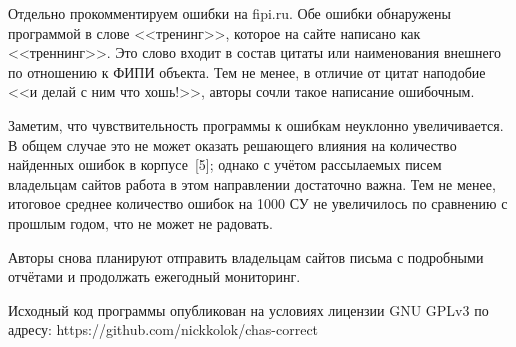 Отдельно прокомментируем ошибки на fipi.ru.
Обе ошибки обнаружены программой в слове <<тренинг>>,
которое на сайте написано как <<треннинг>>.
Это слово входит в состав цитаты или наименования внешнего по отношению к ФИПИ объекта.
Тем не менее, в отличие от цитат наподобие <<и делай с ним что хошь!>>,
авторы сочли такое написание ошибочным.

Заметим, что чувствительность программы к ошибкам неук\-лон\-но увеличивается.
В общем случае это не может оказать решающего влияния на количество найденных ошибок в корпусе~[5];
однако с учётом рассылаемых писем владельцам сайтов работа в этом направлении достаточно важна.
Тем не менее,
итоговое среднее количество ошибок на 1000 СУ не увеличилось по сравнению с прошлым годом, что не может не радовать.

Авторы снова планируют отправить владельцам сайтов письма с подробными отчётами
и продолжать ежегодный мониторинг.

Исходный код программы опубликован на условиях лицензии GNU GPLv3 по адресу:
https://github.com/nickkolok/chas-correct

